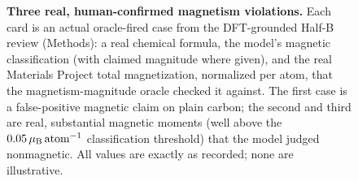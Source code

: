 \begin{figure}[t]
\caption{\textbf{Three real, human-confirmed magnetism violations.} Each card is an actual
oracle-fired case from the DFT-grounded Half-B review (Methods): a real chemical formula,
the model's magnetic classification (with claimed magnitude where given), and the real
Materials Project total magnetization, normalized per atom, that the magnetism-magnitude
oracle checked it against. The first case is a false-positive magnetic claim on plain
carbon; the second and third are real, substantial magnetic moments (well above the
$0.05\,\mu_{\rm B}\,{\rm atom}^{-1}$ classification threshold) that the model judged
nonmagnetic. All values are exactly as recorded; none are illustrative.}
\label{fig:magnetism-cases}
\end{figure}
